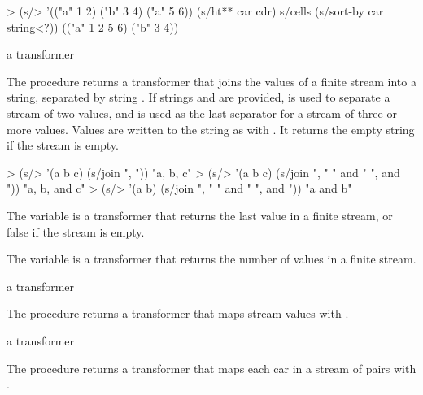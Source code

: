 \codebegin
> (s/> '(("a" 1 2) ("b" 3 4) ("a" 5 6))
    (s/ht** car cdr)
    s/cells
    (s/sort-by car string<?))
(("a" 1 2 5 6) ("b" 3 4))
\codeend

\begin{procedure}
\end{procedure}
\returns{} a transformer

The  procedure returns a transformer that joins the values of a finite stream
into a string, separated by string . If strings  and 
are provided,  is used to separate a stream of two values, and 
is used as the last separator for a stream of three or more values.  Values are written to
the string as with . It returns the empty string if the stream is empty.

\codebegin
> (s/> '(a b c) (s/join ", "))
"a, b, c"
> (s/> '(a b c) (s/join ", " " and " ", and "))
"a, b, and c"
> (s/> '(a b) (s/join ", " " and " ", and "))
"a and b"
\codeend

\begin{variable}
\end{variable}
\antipar

The  variable is a transformer that returns the last value in a finite stream,
or false if the stream is empty.

\begin{variable}
\end{variable}
\antipar

The  variable is a transformer that returns the number of values in a
finite stream.

\begin{procedure}
\end{procedure}
\returns{} a transformer

The  procedure returns a transformer that maps stream values with
.

\begin{procedure}
\end{procedure}
\returns{} a transformer

The  procedure returns a transformer that maps each car in a
stream of pairs with .

